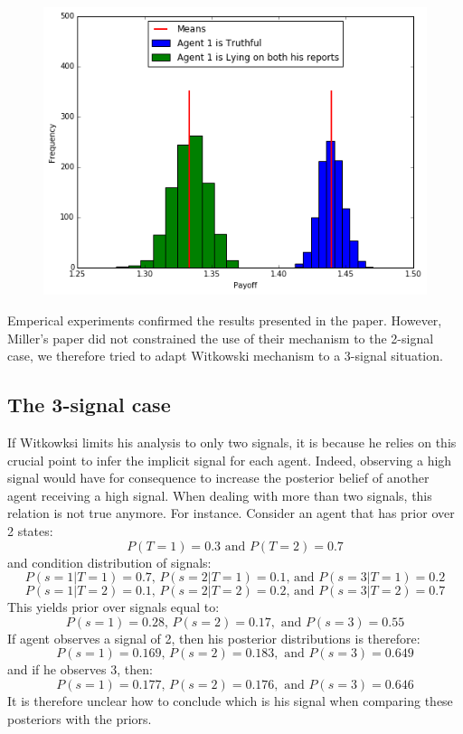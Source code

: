 \documentclass{scrartcl}
\begin{document}
\begin{figure}[H]
\centering
\includegraphics[scale=0.5]{images/pp_both}
\end{figure}

Emperical experiments confirmed the results presented in the paper. However, Miller's paper did not constrained the use of their mechanism to the 2-signal case, we therefore tried to adapt Witkowski mechanism to a 3-signal situation.

\subsection{The 3-signal case}

If Witkowksi limits his analysis to only two signals, it is because he relies on this crucial point to infer the implicit signal for each agent. Indeed, observing a high signal would have for consequence to increase the posterior belief  of another agent receiving a high signal. When dealing with more than two signals, this relation is not true anymore. For instance. Consider an agent that has prior over 2 states:
$$P(T = 1) = 0.3 \text{ and } P(T=2) = 0.7$$
and condition distribution of signals:
$$P(s = 1 | T = 1) = 0.7,\, P(s = 2 | T = 1) = 0.1, \, \text{and } P(s = 3 | T = 1) = 0.2$$
$$P(s = 1 | T = 2) = 0.1,\, P(s = 2 | T = 2) = 0.2, \, \text{and } P(s = 3 | T = 2) = 0.7$$
This yields prior over signals equal to:
$$P(s = 1) = 0.28, \, P(s=2) = 0.17,\text{ and } P(s=3)=0.55$$
If agent observes a signal of 2, then his posterior distributions is therefore:
$$P(s = 1) = 0.169, \, P(s=2) = 0.183,\text{ and } P(s=3)=0.649$$
and if he observes 3, then:
$$P(s = 1) = 0.177, \, P(s=2) = 0.176,\text{ and } P(s=3)=0.646$$
It is therefore unclear how to conclude which is his signal when comparing these posteriors with the priors.\\ 
\end{document}
